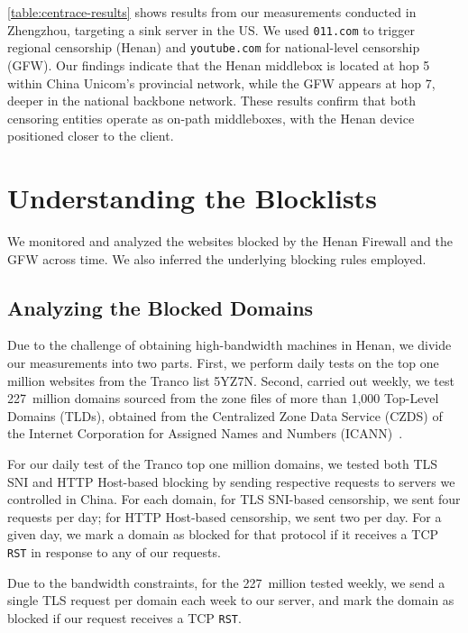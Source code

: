 \documentclass[conference,compsoc]{IEEEtran}
\begin{document}
\autoref{table:centrace-results} shows results from our measurements conducted in
Zhengzhou, targeting a sink server in the US. We used \texttt{011.com} to trigger
regional censorship (Henan) and \texttt{youtube.com} for national-level censorship (GFW).
Our findings indicate that the Henan middlebox is located at hop 5 within
China Unicom’s provincial network, while the GFW appears at hop 7, deeper
in the national backbone network. These results confirm that both censoring entities
operate as on-path middleboxes, with the Henan device positioned closer to the client.


\section{Understanding the Blocklists}
\label{sec:blocklists}

We monitored and analyzed the websites blocked by the Henan Firewall and the GFW across time.
We also inferred the underlying blocking rules employed.

\subsection{Analyzing the Blocked Domains}
\label{sec:blocked-domains}

Due to the challenge of obtaining high-bandwidth machines in Henan,
we divide our measurements into two parts.
First, we perform daily tests on the top one million websites from the Tranco list 5YZ7N.
Second, carried out weekly,
we test 227~million domains sourced from the zone files of more than 1,000 Top-Level Domains (TLDs), obtained from the Centralized Zone Data Service (CZDS) of the Internet Corporation for Assigned Names and Numbers (ICANN)~\cite{SignInCe67:online}.

For our daily test of the Tranco top one million domains,
we tested both TLS SNI and HTTP Host-based blocking by sending respective requests to
servers we controlled in China.
For each domain, for TLS SNI-based censorship,
we sent four requests per day;
for HTTP Host-based censorship,
we sent two per day. For a given day, we mark a domain as blocked for that protocol if it receives a TCP \texttt{RST} in response to any of our requests.


Due to the bandwidth constraints, for the 227~million tested weekly, we send a single TLS request per domain each week to our server, and mark the domain as blocked if our request receives a TCP \texttt{RST}.
\end{document}
